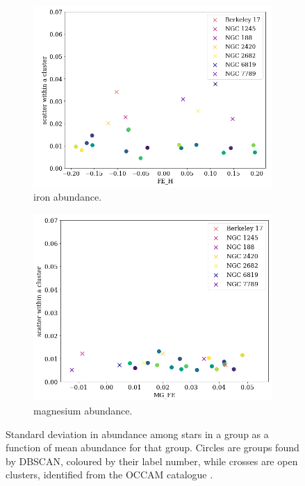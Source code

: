 \documentclass[11pt]{article}
\begin{document}
\begin{figure}
  \centering
  \begin{subfigure}[b]{0.45\textwidth}
    \includegraphics[width=\textwidth]{compactness.png}
   \caption{iron abundance.}
  \label{fig:fecompact}
  \end{subfigure}
\hfill
  \begin{subfigure}[b]{0.45\textwidth}
    \includegraphics[width=\textwidth]{mgcompactness.png}
  \caption{magnesium abundance.}  
  \label{fig:mgcompact}
  \end{subfigure}
  \hfill
    \caption{Standard deviation in abundance among stars in a group as a function of mean abundance for that group. Circles are groups found by DBSCAN, coloured by their label number, while crosses are open clusters, identified from the OCCAM catalogue \citep{occam}.}
    \label{fig:compact}
\end{figure}
\end{document}
